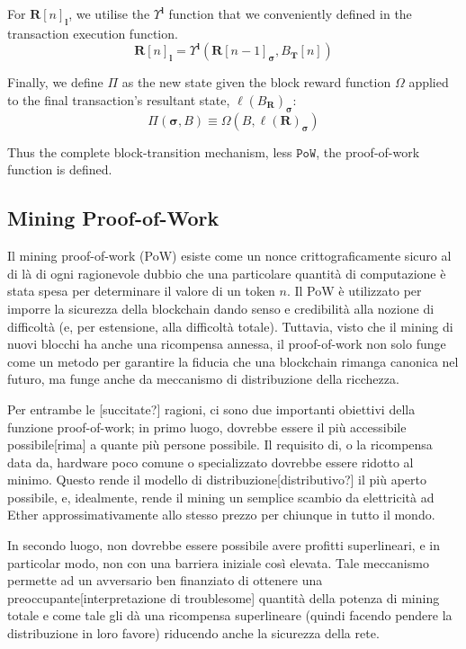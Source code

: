 \documentclass[9pt,oneside]{amsart}
\begin{document}
\begin{multicols}{2}
For $\mathbf{R}[n]_\mathbf{l}$, we utilise the $\Upsilon^\mathbf{l}$ function that we conveniently defined in the transaction execution function.
\begin{equation}
\mathbf{R}[n]_\mathbf{l} = 
\Upsilon^\mathbf{l}(\mathbf{R}[n - 1]_{\boldsymbol{\sigma}}, B_\mathbf{T}[n])
\end{equation}

Finally, we define $\Pi$ as the new state given the block reward function $\Omega$ applied to the final transaction's resultant state, $\ell(B_\mathbf{R})_{\boldsymbol{\sigma}}$:
\begin{equation}
\Pi(\boldsymbol{\sigma}, B) \equiv \Omega(B, \ell(\mathbf{R})_{\boldsymbol{\sigma}})
\end{equation}

Thus the complete block-transition mechanism, less $\mathtt{PoW}$, the proof-of-work function is defined.

\subsection{Mining Proof-of-Work} \label{ch:pow}

Il mining proof-of-work (PoW) esiste come un nonce crittograficamente sicuro al di là di ogni ragionevole dubbio che una particolare quantità di computazione è stata spesa per determinare il valore di un token $n$. Il PoW è utilizzato per imporre la sicurezza della blockchain dando senso e credibilità alla nozione di difficoltà (e, per estensione, alla difficoltà totale). Tuttavia, visto che il mining di nuovi blocchi ha anche una ricompensa annessa, il proof-of-work non solo funge come un metodo per garantire la fiducia che una blockchain rimanga canonica nel futuro, ma funge anche da meccanismo di distribuzione della ricchezza.

Per entrambe le [succitate?] ragioni, ci sono due importanti obiettivi della funzione proof-of-work; in primo luogo, dovrebbe essere il più accessibile possibile[rima] a quante più persone possibile. Il requisito di, o la ricompensa data da, hardware poco comune o specializzato dovrebbe essere ridotto al minimo. Questo rende il modello di distribuzione[distributivo?] il più aperto possibile, e, idealmente, rende il mining un semplice scambio da elettricità ad Ether approssimativamente allo stesso prezzo per chiunque in tutto il mondo.

In secondo luogo, non dovrebbe essere possibile avere profitti superlineari, e in particolar modo, non con una barriera iniziale così elevata. Tale meccanismo permette ad un avversario ben finanziato di ottenere una preoccupante[interpretazione di troublesome] quantità della potenza di mining totale e come tale gli dà una ricompensa superlineare (quindi facendo pendere la distribuzione in loro favore) riducendo anche la sicurezza della rete.


\end{multicols}
\end{document}
